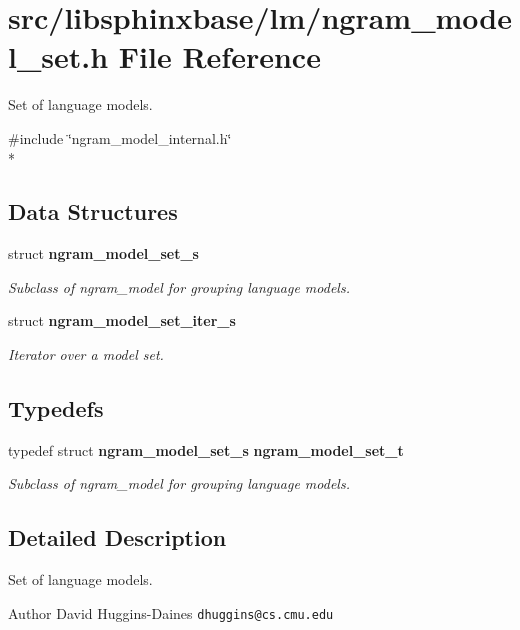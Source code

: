 \section{src/libsphinxbase/lm/ngram\+\_\+model\+\_\+set.h File Reference}
\label{ngram__model__set_8h}


Set of language models.  


{\ttfamily \#include \char`\"{}ngram\+\_\+model\+\_\+internal.\+h\char`\"{}}\\*
\subsection*{Data Structures}
\begin{DoxyCompactItemize}
\item 
struct {\bf ngram\+\_\+model\+\_\+set\+\_\+s}
\begin{DoxyCompactList}\small\item\em Subclass of ngram\+\_\+model for grouping language models. \end{DoxyCompactList}\item 
struct {\bf ngram\+\_\+model\+\_\+set\+\_\+iter\+\_\+s}
\begin{DoxyCompactList}\small\item\em Iterator over a model set. \end{DoxyCompactList}\end{DoxyCompactItemize}
\subsection*{Typedefs}
\begin{DoxyCompactItemize}
\item 
typedef struct {\bf ngram\+\_\+model\+\_\+set\+\_\+s} {\bf ngram\+\_\+model\+\_\+set\+\_\+t}\label{ngram__model__set_8h_af89b4060ed18e3f4e3ac0490a09d5745}

\begin{DoxyCompactList}\small\item\em Subclass of ngram\+\_\+model for grouping language models. \end{DoxyCompactList}\end{DoxyCompactItemize}


\subsection{Detailed Description}
Set of language models. 

\begin{DoxyAuthor}{Author}
David Huggins-\/\+Daines {\tt dhuggins@cs.\+cmu.\+edu} 
\end{DoxyAuthor}
